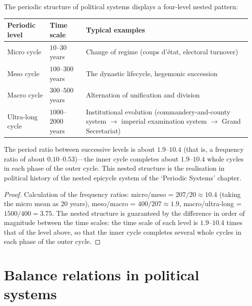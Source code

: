 \begin{theorem}\label{thm:politics_nested_periods}
The periodic structure of political systems displays a four-level nested pattern:
\begin{center}
\begin{tabular}{>{\centering\arraybackslash}p{3cm}>{\centering\arraybackslash}p{2.5cm}>{\centering\arraybackslash}p{4cm}}
\toprule
Periodic level & Time scale & Typical examples \\
\midrule
Micro cycle & $10$--$30$ years & Change of regime (coups d'état, electoral turnover) \\
Meso cycle & $100$--$300$ years & The dynastic lifecycle, hegemonic succession \\
Macro cycle & $300$--$500$ years & Alternation of unification and division \\
Ultra-long cycle & $1000$--$2000$ years & Institutional evolution (commandery-and-county system $\to$ imperial examination system $\to$ Grand Secretariat) \\
\bottomrule
\end{tabular}
\end{center}
The period ratio between successive levels is about $1.9$--$10.4$ (that is, a frequency ratio of about $0.10$--$0.53$)---the inner cycle completes about $1.9$--$10.4$ whole cycles in each phase of the outer cycle. This nested structure is the realisation in political history of the nested epicycle system of the `Periodic Systems' chapter.
\end{theorem}

\begin{proof}
Calculation of the frequency ratios: micro/meso = $207/20\approx10.4$ (taking the micro mean as $20$ years), meso/macro = $400/207\approx1.9$, macro/ultra-long = $1500/400=3.75$. The nested structure is guaranteed by the difference in order of magnitude between the time scales: the time scale of each level is $1.9$--$10.4$ times that of the level above, so that the inner cycle completes several whole cycles in each phase of the outer cycle.
\end{proof}

\section{Balance relations in political systems}


